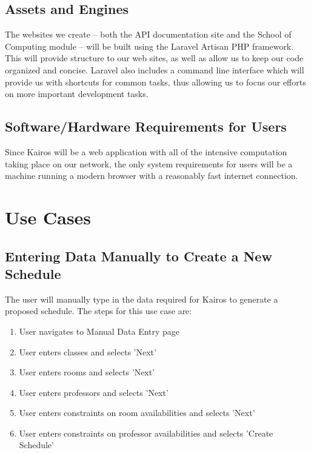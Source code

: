 \documentclass{extarticle}
\begin{document}
\subsection{Assets and Engines}
The websites we create -- both the API documentation site and the School of Computing module -- will be built using
the Laravel Artisan PHP framework.  This will provide structure to our web sites, as well as allow us to keep our
code organized and concise.  Laravel also includes a command line interface which will provide us with shortcuts
for common tasks, thus allowing us to focus our efforts on more important development tasks.

\subsection{Software/Hardware Requirements for Users}
Since Kairos will be a web application with all of the intensive computation taking place on our network, the only
system requirements for users will be a machine running a modern browser with a reasonably fast internet connection.

\newpage

\appendix
\section{Use Cases}

\subsection{Entering Data Manually to Create a New Schedule}
The user will manually type in the data required for Kairos to generate a proposed schedule.
The steps for this use case are:

\begin{enumerate}
\item User navigates to Manual Data Entry page
\item User enters classes and selects 'Next'
\item User enters rooms and selects 'Next'
\item User enters professors and selects 'Next'
\item User enters constraints on room availabilities and selects 'Next'
\item User enters constraints on professor availabilities and selects 'Create Schedule'
\end{enumerate}
\end{document}
